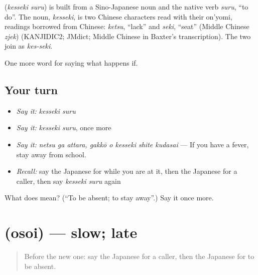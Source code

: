 \begin{cousinweb}
\textbf{} (\emph{kesseki suru}) is built from a Sino-Japanese noun and the native verb \emph{suru}, \textquotedblleft{}to do\textquotedblright{}. The noun, \emph{kesseki}, is two Chinese characters read with their on'yomi, readings borrowed from Chinese: \emph{ketsu}, \textquotedblleft{}lack\textquotedblright{} and \emph{seki}, \textquotedblleft{}seat\textquotedblright{} (Middle Chinese \emph{zjek}) (KANJIDIC2; JMdict; Middle Chinese in Baxter's transcription). The two join as \emph{kes-seki}.
\end{cousinweb}

\begin{grammarlens}[title={What you've built}]
One more word for saying what happens if.
\end{grammarlens}

\subsection*{Your turn}
\begin{itemize}
\raggedright
  \item \emph{Say it:} \emph{kesseki suru}
  \item \emph{Say it:} \emph{kesseki suru}, once more
  \item \emph{Say it:} \emph{netsu ga attara, gakkō o kesseki shite kudasai} — If you have a fever, stay away from school.
  \item \emph{Recall:} say the Japanese for while you are at it, then the Japanese for a caller, then say \emph{kesseki suru} again
\end{itemize}

\begin{tcolorbox}[breakable,colback=teal!4,colframe=teal!35!black,title={Before you move on}]
What does  mean? (\textquotedblleft{}To be absent; to stay away\textquotedblright{}.) Say it once more.
\end{tcolorbox}
\section[\texorpdfstring{\ja{おそい} (osoi)}{おそい (osoi)}]{ (osoi) — slow; late}

\label{lesson:JA-C348-osoi}



\begin{quote}
Before the new one: say the Japanese for a caller, then the Japanese for to be absent.
\end{quote}

